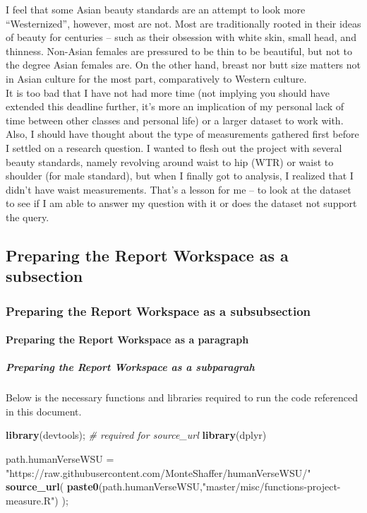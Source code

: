 \documentclass[]{article}
\newenvironment{Shaded}{\begin{snugshade}}{\end{snugshade}}
\newcommand{\CommentTok}[1]{\textcolor[rgb]{0.56,0.35,0.01}{\textit{#1}}}
\newcommand{\KeywordTok}[1]{\textcolor[rgb]{0.13,0.29,0.53}{\textbf{#1}}}
\newcommand{\NormalTok}[1]{#1}
\newcommand{\StringTok}[1]{\textcolor[rgb]{0.31,0.60,0.02}{#1}}
\begin{document}
I feel that some Asian beauty standards are an attempt to look more
\enquote{Westernized}, however, most are not. Most are traditionally
rooted in their ideas of beauty for centuries -- such as their obsession
with white skin, small head, and thinness. Non-Asian females are
pressured to be thin to be beautiful, but not to the degree Asian
females are. On the other hand, breast nor butt size matters not in
Asian culture for the most part, comparatively to Western culture.\\
\vspace{5mm} It is too bad that I have not had more time (not implying
you should have extended this deadline further, it's more an implication
of my personal lack of time between other classes and personal life) or
a larger dataset to work with. Also, I should have thought about the
type of measurements gathered first before I settled on a research
question. I wanted to flesh out the project with several beauty
standards, namely revolving around waist to hip (WTR) or waist to
shoulder (for male standard), but when I finally got to analysis, I
realized that I didn't have waist measurements. That's a lesson for me
-- to look at the dataset to see if I am able to answer my question with
it or does the dataset not support the query.

\newpage

\subsection{Preparing the Report Workspace as a subsection}
\label{sec:appendix-setup}

\subsubsection{Preparing the Report Workspace as a subsubsection}
\label{sec:appendix-setup2}

\paragraph{Preparing the Report Workspace as a paragraph}
\label{sec:appendix-setup3}

\subparagraph{Preparing the Report Workspace as a subparagrah}
\label{sec:appendix-setup4}

Below is the necessary functions and libraries required to run the code
referenced in this document.

\begin{Shaded}
\begin{Highlighting}[]
\KeywordTok{library}\NormalTok{(devtools);       }\CommentTok{# required for source_url}
\KeywordTok{library}\NormalTok{(dplyr)}

\NormalTok{path.humanVerseWSU =}\StringTok{ "https://raw.githubusercontent.com/MonteShaffer/humanVerseWSU/"}
\KeywordTok{source_url}\NormalTok{( }\KeywordTok{paste0}\NormalTok{(path.humanVerseWSU,}\StringTok{"master/misc/functions-project-measure.R"}\NormalTok{) );}
\end{Highlighting}
\end{Shaded}
\end{document}
